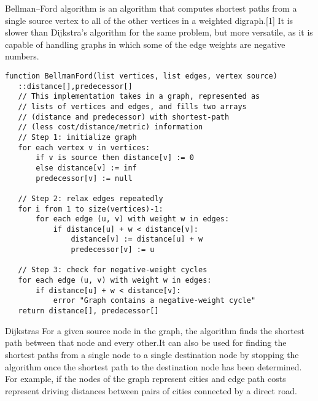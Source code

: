 \documentclass[10 pt]{article}
\begin{document}
Bellman–Ford algorithm is an algorithm that computes shortest paths from a single source vertex to all of the other vertices in a weighted digraph.[1] It is slower than Dijkstra's algorithm for the same problem, but more versatile, as it is capable of handling graphs in which some of the edge weights are negative numbers.

\begin{verbatim}
function BellmanFord(list vertices, list edges, vertex source)
   ::distance[],predecessor[]
   // This implementation takes in a graph, represented as
   // lists of vertices and edges, and fills two arrays
   // (distance and predecessor) with shortest-path
   // (less cost/distance/metric) information
   // Step 1: initialize graph
   for each vertex v in vertices:
       if v is source then distance[v] := 0
       else distance[v] := inf
       predecessor[v] := null

   // Step 2: relax edges repeatedly
   for i from 1 to size(vertices)-1:
       for each edge (u, v) with weight w in edges:
           if distance[u] + w < distance[v]:
               distance[v] := distance[u] + w
               predecessor[v] := u

   // Step 3: check for negative-weight cycles
   for each edge (u, v) with weight w in edges:
       if distance[u] + w < distance[v]:
           error "Graph contains a negative-weight cycle"
   return distance[], predecessor[]
\end{verbatim}

Dijkstras For a given source node in the graph, the algorithm finds the shortest path between that node and every other.It can also be used for finding the shortest paths from a single node to a single destination node by stopping the algorithm once the shortest path to the destination node has been determined. For example, if the nodes of the graph represent cities and edge path costs represent driving distances between pairs of cities connected by a direct road.
\end{document}
